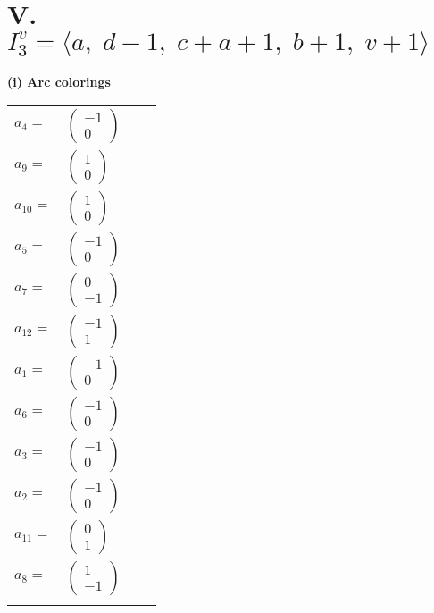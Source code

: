 \documentclass[1p]{elsarticle_modified}
\theoremstyle{definition}
\begin{document}
\centering \section*{V. $I^v_{3}= \langle a,\;d-1,\;c+a+1,\;b+1,\;v+1 \rangle$}
\flushleft \textbf{(i) Arc colorings}\\
\begin{tabular}{m{7pt} m{180pt} m{7pt} m{180pt} }
\flushright $a_{4}=$&$\begin{pmatrix}-1\\0\end{pmatrix}$ \\
\flushright $a_{9}=$&$\begin{pmatrix}1\\0\end{pmatrix}$ \\
\flushright $a_{10}=$&$\begin{pmatrix}1\\0\end{pmatrix}$ \\
\flushright $a_{5}=$&$\begin{pmatrix}-1\\0\end{pmatrix}$ \\
\flushright $a_{7}=$&$\begin{pmatrix}0\\-1\end{pmatrix}$ \\
\flushright $a_{12}=$&$\begin{pmatrix}-1\\1\end{pmatrix}$ \\
\flushright $a_{1}=$&$\begin{pmatrix}-1\\0\end{pmatrix}$ \\
\flushright $a_{6}=$&$\begin{pmatrix}-1\\0\end{pmatrix}$ \\
\flushright $a_{3}=$&$\begin{pmatrix}-1\\0\end{pmatrix}$ \\
\flushright $a_{2}=$&$\begin{pmatrix}-1\\0\end{pmatrix}$ \\
\flushright $a_{11}=$&$\begin{pmatrix}0\\1\end{pmatrix}$ \\
\flushright $a_{8}=$&$\begin{pmatrix}1\\-1\end{pmatrix}$\\&\end{tabular}
\end{document}
